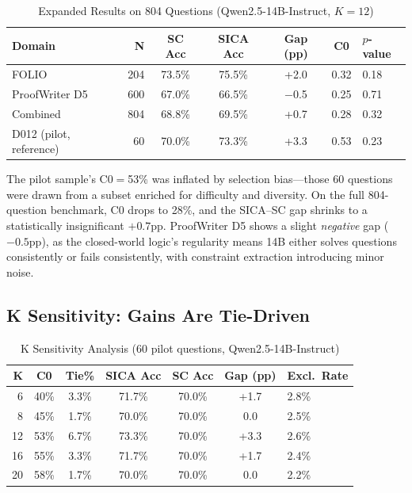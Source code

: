 \documentclass[11pt]{article}
\begin{document}
\begin{table}[h]
\centering
\caption{Expanded Results on 804 Questions (Qwen2.5-14B-Instruct, $K=12$)}
\label{tab:expanded}
\begin{tabular}{lrccccl}
\toprule
Domain & N & SC Acc & SICA Acc & Gap (pp) & C0 & $p$-value \\
\midrule
FOLIO & 204 & 73.5\% & 75.5\% & +2.0 & 0.32 & 0.18 \\
ProofWriter D5 & 600 & 67.0\% & 66.5\% & $-$0.5 & 0.25 & 0.71 \\
Combined & 804 & 68.8\% & 69.5\% & +0.7 & 0.28 & 0.32 \\
\midrule
D012 (pilot, reference) & 60 & 70.0\% & 73.3\% & +3.3 & 0.53 & 0.23 \\
\bottomrule
\end{tabular}
\end{table}

The pilot sample's C0$=$53\% was inflated by selection bias---those 60 questions were drawn from a subset enriched for difficulty and diversity. On the full 804-question benchmark, C0 drops to 28\%, and the SICA--SC gap shrinks to a statistically insignificant $+0.7$pp. ProofWriter D5 shows a slight \emph{negative} gap ($-0.5$pp), as the closed-world logic's regularity means 14B either solves questions consistently or fails consistently, with constraint extraction introducing minor noise.

\subsection{K Sensitivity: Gains Are Tie-Driven}

\begin{table}[h]
\centering
\caption{K Sensitivity Analysis (60 pilot questions, Qwen2.5-14B-Instruct)}
\label{tab:k_ablation}
\begin{tabular}{rcccccl}
\toprule
K & C0 & Tie\% & SICA Acc & SC Acc & Gap (pp) & Excl.\ Rate \\
\midrule
6 & 40\% & 3.3\% & 71.7\% & 70.0\% & +1.7 & 2.8\% \\
8 & 45\% & 1.7\% & 70.0\% & 70.0\% & 0.0 & 2.5\% \\
12 & 53\% & 6.7\% & 73.3\% & 70.0\% & +3.3 & 2.6\% \\
16 & 55\% & 3.3\% & 71.7\% & 70.0\% & +1.7 & 2.4\% \\
20 & 58\% & 1.7\% & 70.0\% & 70.0\% & 0.0 & 2.2\% \\
\bottomrule
\end{tabular}
\end{table}
\end{document}
